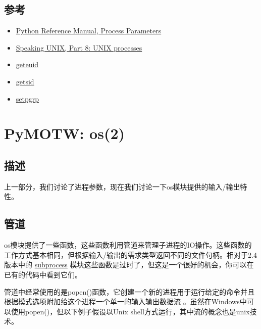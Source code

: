 \documentclass[letterpaper,10pt,english]{manual}
\begin{document}
\subsection{参考}
\begin{itemize}
\item {} 
\href{http://docs.python.org/lib/os-procinfo.html}{Python Reference Manual, Process Parameters}

\item {} 
\href{http://www.ibm.com/developerworks/aix/library/au-speakingunix8/index.html}{Speaking UNIX, Part 8: UNIX processes}

\item {} 
\href{http://www.opengroup.org/onlinepubs/009695399/functions/geteuid.html}{geteuid}

\item {} 
\href{http://opengroup.org/onlinepubs/007908799/xsh/getsid.html}{getsid}

\item {} 
\href{http://linux.about.com/library/cmd/blcmdl2\_setpgrp.htm}{setpgrp}

\end{itemize}

\resetcurrentobjects


\section{PyMOTW: os(2)}


\subsection{描述}

上一部分，我们讨论了进程参数，现在我们讨论一下os模块提供的输入/输出特性。


\subsection{管道}

os模块提供了一些函数，这些函数利用管道来管理子进程的IO操作。这些函数的工作方式基本相同，但根据输入/输出的需求类型返回不同的文件句柄。相对于2.4版本中的 \href{http://docs.python.org/lib/module-subprocess.html}{subprocess} 模块这些函数是过时了，但这是一个很好的机会，你可以在已有的代码中看到它们。

管道中经常使用的是popen()函数，它创建一个新的进程用于运行给定的命令并且根据模式选项附加给这个进程一个单一的输入输出数据流 。虽然在Windows中可以使用popen()，但以下例子假设以Unix shell方式运行，其中流的概念也是unix技术。
\end{document}
